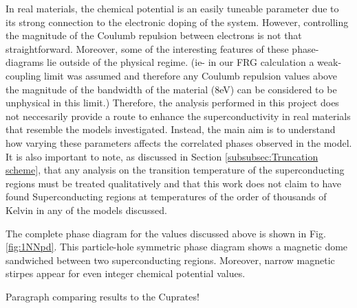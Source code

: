 \documentclass[12pt]{article}
\begin{document}
\noindent In real materials,  the chemical potential is an easily tuneable parameter due to its strong connection to the electronic doping of the system.
However, controlling the magnitude of the Coulumb repulsion between electrons is not that straightforward. 
Moreover, some of the interesting features of these phase-diagrams lie outside of the physical regime. (ie- in our FRG calculation a weak-coupling limit was 
assumed and therefore any Coulumb repulsion values above the magnitude of the  bandwidth of the material (8eV) can be considered to be unphysical in this limit.)
Therefore, the analysis performed in this project does not neccesarily provide a route to enhance the superconductivity in real materials that resemble the models investigated. Instead, the main aim is to understand how varying these parameters affects the correlated phases observed in the model. It is also important to note, as discussed in Section \ref{subsubsec:Truncation scheme}, that any analysis on the transition temperature
of the superconducting regions must be treated qualitatively and that this work does not claim to have found Superconducting regions at temperatures of the order of thousands of Kelvin in any of the models discussed. \par 

\medskip
\noindent The complete phase diagram for the values discussed above is shown in Fig.\ref{fig:1NNpd}. This particle-hole symmetric phase diagram shows a magnetic dome sandwiched between two superconducting regions. Moreover, narrow magnetic stirpes appear for even
integer chemical potential values.
\par

\medskip

\noindent Paragraph comparing results to the Cuprates!
\end{document}
